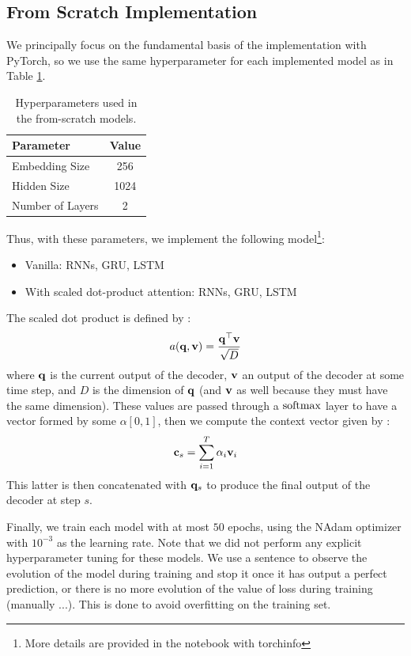 \subsection{From Scratch Implementation}

We principally focus on the fundamental basis of the implementation with PyTorch, so we use the same hyperparameter for each implemented model as in Table \ref{tab:hyper}.
\begin{table}[H]
	\centering
	\begin{tabular}{lc}
		\toprule
		Parameter & Value \\
		\midrule
		Embedding Size & 256 \\
		Hidden Size & 1024 \\
		Number of Layers & 2 \\
		\bottomrule
	\end{tabular}
	\caption{Hyperparameters used in the from-scratch models.}
	\label{tab:hyper}
\end{table}
Thus, with these parameters, we implement the following model\footnote{More details are provided in the notebook with torchinfo}:
\begin{itemize}
	\item Vanilla: RNNs, GRU, LSTM
	\item With scaled dot-product attention:  RNNs, GRU, LSTM
\end{itemize}
The scaled dot product is defined by :
\begin{equation}
	a(\mathbf{q, v}) = \frac{\mathbf{q^\top v}}{\sqrt{D}}
\end{equation}
where $\mathbf{q}$ is the current output of the decoder, $\mathbf{v}$ an output of the decoder at some time step, and  $D$ is the dimension of $\mathbf{q}$ (and $\mathbf{v}$ as well because they must have the same dimension). These values are passed through a $\mathrm{softmax}$ layer to have a vector formed by some $\alpha[0,1]$, then we compute the context vector given by :
\begin{equation}
	\mathbf{c}_s = \sum_{i=1}^{T}\alpha_i \mathbf{v}_i
\end{equation}
This latter is then concatenated with $\mathbf{q}_s$ to produce the final output of the decoder at step $s$.

Finally, we train each model with at most $50$ epochs, using the NAdam optimizer with $10^{-3}$ as the learning rate. Note that we did not perform any explicit hyperparameter tuning for these models. We use a sentence to observe the evolution of the model during training and stop it once it has output a perfect prediction, or there is no more evolution of the value of loss during training (manually ...). This is done to avoid overfitting on the training set.

